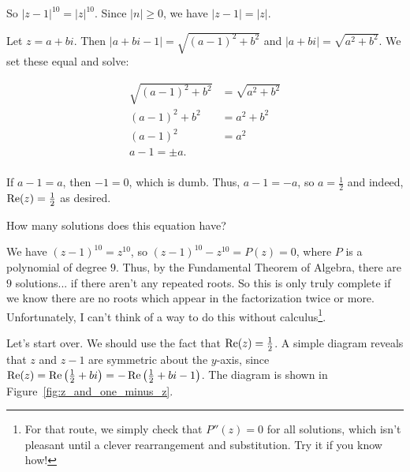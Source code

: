 \documentclass[../key.tex]{subfiles}
\begin{document}
So $|z-1|^10=|z|^10$. Since $|n|\geq 0$, we have $|z-1|=|z|$.

Let $z=a+bi$. Then $|a+bi-1|=\sqrt{(a-1)^2+b^2}$ and $|a+bi|=\sqrt{a^2+b^2}$. We set these equal and solve:

\begin{align*}
\sqrt{(a-1)^2+b^2} &= \sqrt{a^2+b^2} \\
(a-1)^2 + b^2 &= a^2 + b^2 \\
(a-1)^2 &= a^2 \\
a-1 = \pm a. \\
\end{align*}

If $a-1=a$, then $-1=0$, which is dumb. Thus, $a-1=-a$, so $a=\frac{1}{2}$ and indeed, $\operatorname{Re}(z) = \frac{1}{2}$ as desired.

\begin{inner_problem}
\item How many solutions does this equation have?
\end{inner_problem}

We have $(z-1)^{10}=z^{10}$, so $(z-1)^{10}-z^{10} = P(z) = 0$, where $P$ is a polynomial of degree $9$. Thus, by the Fundamental Theorem of Algebra, there are $9$ solutions... if there aren't any repeated roots. So this is only truly complete if we know there are no roots which appear in the factorization twice or more. Unfortunately, I can't think of a way to do this without calculus\footnote{For that route, we simply check that $P''(z)=0$ for all solutions, which isn't pleasant until a clever rearrangement and substitution. Try it if you know how!}.

Let's start over. We should use the fact that $\operatorname{Re}(z)=\frac{1}{2}$. A simple diagram reveals that $z$ and $z-1$ are symmetric about the $y$-axis, since $\operatorname{Re}(z) = \operatorname{Re}\left(\frac{1}{2}+bi\right) = -\operatorname{Re}\left(\frac{1}{2}+bi-1\right)$. The diagram is shown in Figure~\ref{fig:z_and_one_minus_z}.
\end{document}
